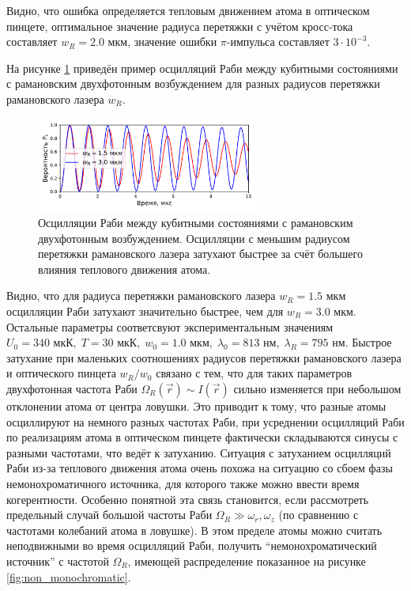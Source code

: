 Видно, что ошибка определяется тепловым движением атома в оптическом пинцете, оптимальное значение радиуса перетяжки с учётом кросс-тока составляет $w_{R} = 2.0\text{ мкм}$, значение ошибки $\pi$-импульса составляет $3 \cdot 10^{-3}$.

На рисунке \ref{fig:rabi_sample} приведён пример осцилляций Раби между кубитными состояниями с рамановским двухфотонным возбуждением для разных радиусов перетяжки рамановского лазера $w_R$. 

\begin{figure}[H]
	\centering
	\includegraphics[width=0.65\textwidth]{images/rabi_sample.pdf}
	\caption{Осцилляции Раби между кубитными состояниями с рамановским двухфотонным возбуждением. Осцилляции с меньшим радиусом перетяжки рамановского лазера затухают быстрее за счёт большего влияния теплового движения атома.}
	\label{fig:rabi_sample}
\end{figure}

Видно, что для радиуса перетяжки рамановского лазера $w_R = 1.5 \text{ мкм}$ осцилляции Раби затухают значительно быстрее, чем для $w_R = 3.0\text{ мкм}$. Остальные параметры соответсвуют экспериментальным значениям $U_0 = 340\text{ мкК}, \; T = 30\text{ мкК}, \; w_0 = 1.0\text{ мкм}, \; \lambda_0 = 813\text{ нм}, \; \lambda_{R} = 795 \text{ нм}$. Быстрое затухание при маленьких соотношениях радиусов перетяжки рамановского лазера и оптического пинцета $w_R/w_0$ связано с тем, что для таких параметров двухфотонная частота Раби $\Omega_{R}(\vec{r}) \sim I(\vec{r})$ сильно изменяется при небольшом отклонении атома от центра ловушки. Это приводит к тому, что разные атомы осциллируют на немного разных частотах Раби, при усреднении осцилляций Раби по реализациям атома в оптическом пинцете фактически складываются синусы с разными частотами, что ведёт к затуханию. Ситуация с затуханием осцилляций Раби из-за теплового движения атома очень похожа на ситуацию со сбоем фазы немонохроматичного источника, для которого также можно ввести время когерентности. Особенно понятной эта связь становится, если рассмотреть предельный случай большой частоты Раби $\Omega_{R} \gg \omega_r, \omega_z$ (по сравнению с частотами колебаний атома в ловушке). В этом пределе атомы можно считать неподвижными во время осцилляций Раби, получить ``немонохроматический источник'' с частотой $\Omega_{R}$, имеющей распределение показанное на рисунке \ref{fig:non_monochromatic}.

